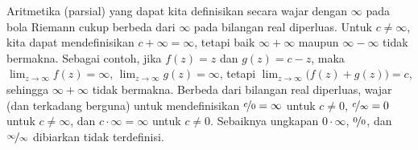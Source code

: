Aritmetika (parsial) yang dapat kita
definisikan secara wajar dengan $\infty$ pada bola Riemann
cukup berbeda dari
$\infty$ pada bilangan real diperluas.
Untuk $c \neq \infty$, kita dapat mendefinisikan $c+\infty = \infty$,
tetapi baik $\infty+\infty$ maupun $\infty-\infty$ tidak bermakna.
Sebagai contoh, jika $f(z) = z$ dan $g(z) = c-z$,
maka $\lim_{z \to \infty} f(z) = \infty$,
$\lim_{z \to \infty} g(z) = \infty$, tetapi $\lim_{z \to \infty}
\bigl(f(z)+g(z)\bigr) = c$, sehingga $\infty+\infty$ tidak bermakna.
Berbeda dari bilangan real diperluas,
wajar (dan terkadang berguna) untuk mendefinisikan $\nicefrac{c}{0} = \infty$ untuk
$c \neq 0$, $\nicefrac{c}{\infty} = 0$ untuk $c \neq \infty$,
dan $c \cdot \infty = \infty$ untuk $c \neq 0$.
Sebaiknya ungkapan $0 \cdot \infty$, $\nicefrac{0}{0}$, dan
$\nicefrac{\infty}{\infty}$ dibiarkan tidak terdefinisi.
